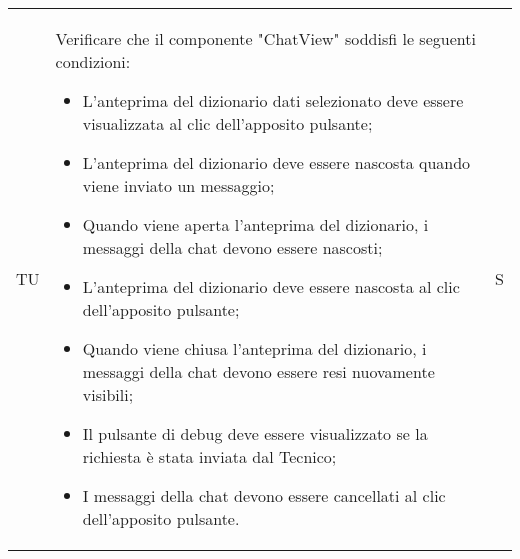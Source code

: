\begin{adjustwidth}{-0.5cm}{-0.5cm}
\begin{longtable}{|P{1.5cm}|>{\raggedright}P{9.5cm}|>{\arraybackslash}P{1.5cm}|}
    \hline TU & Verificare che il componente "ChatView" soddisfi le seguenti condizioni:
    \begin{itemize}
      \item L'anteprima del dizionario dati selezionato deve essere visualizzata al clic dell'apposito pulsante;
      \item L'anteprima del dizionario deve essere nascosta quando viene inviato un messaggio;
      \item Quando viene aperta l'anteprima del dizionario, i messaggi della chat devono essere nascosti;
      \item L'anteprima del dizionario deve essere nascosta al clic dell'apposito pulsante;
      \item Quando viene chiusa l'anteprima del dizionario, i messaggi della chat devono essere resi nuovamente visibili;
      \item Il pulsante di debug deve essere visualizzato se la richiesta è stata inviata dal Tecnico;
      \item I messaggi della chat devono essere cancellati al clic dell'apposito pulsante.
    \end{itemize} & S \\
	\end{longtable}
\end{adjustwidth}
\egroup